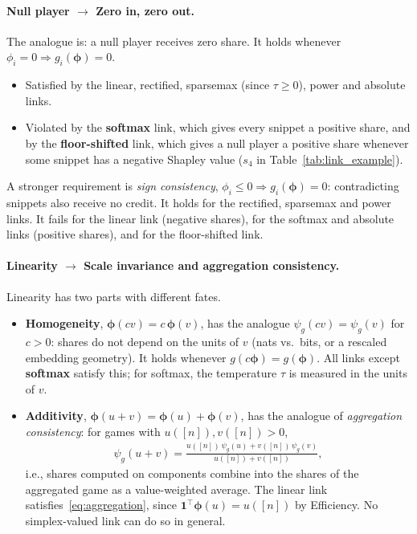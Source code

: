 \documentclass{article}
\begin{document}
\paragraph{Null player $\to$ Zero in, zero out.}
The analogue is: a null player receives zero share. It holds whenever $\phi_i = 0 \Rightarrow g_i(\boldsymbol{\phi}) = 0$.
\begin{itemize}
    \item Satisfied by the linear, rectified, sparsemax (since $\tau \ge 0$), power and absolute links.
    \item Violated by the \textbf{softmax} link, which gives every snippet a positive share, and by the \textbf{floor-shifted} link, which gives a null player a positive share whenever some snippet has a negative Shapley value ($s_4$ in Table~\ref{tab:link_example}).
\end{itemize}
A stronger requirement is \emph{sign consistency}, $\phi_i \le 0 \Rightarrow g_i(\boldsymbol{\phi}) = 0$: contradicting snippets also receive no credit. It holds for the rectified, sparsemax and power links. It fails for the linear link (negative shares), for the softmax and absolute links (positive shares), and for the floor-shifted link.

\paragraph{Linearity $\to$ Scale invariance and aggregation consistency.}
Linearity has two parts with different fates.
\begin{itemize}
    \item \textbf{Homogeneity}, $\boldsymbol{\phi}(cv) = c\, \boldsymbol{\phi}(v)$, has the analogue $\psi_g(cv) = \psi_g(v)$ for $c > 0$: shares do not depend on the units of $v$ (nats vs.\ bits, or a rescaled embedding geometry). It holds whenever $g(c\boldsymbol{\phi}) = g(\boldsymbol{\phi})$. All links except \textbf{softmax} satisfy this; for softmax, the temperature $\tau$ is measured in the units of $v$.
    \item \textbf{Additivity}, $\boldsymbol{\phi}(u + v) = \boldsymbol{\phi}(u) + \boldsymbol{\phi}(v)$, has the analogue of \emph{aggregation consistency}: for games with $u([n]), v([n]) > 0$,
    \begin{align}\label{eq:aggregation}
        \psi_g(u + v) = \frac{u([n])\, \psi_g(u) + v([n])\, \psi_g(v)}{u([n]) + v([n])},
    \end{align}
    i.e., shares computed on components combine into the shares of the aggregated game as a value-weighted average. The linear link satisfies~\eqref{eq:aggregation}, since $\mathbf{1}^\top \boldsymbol{\phi}(u) = u([n])$ by Efficiency. No simplex-valued link can do so in general.
\end{itemize}
\end{document}
